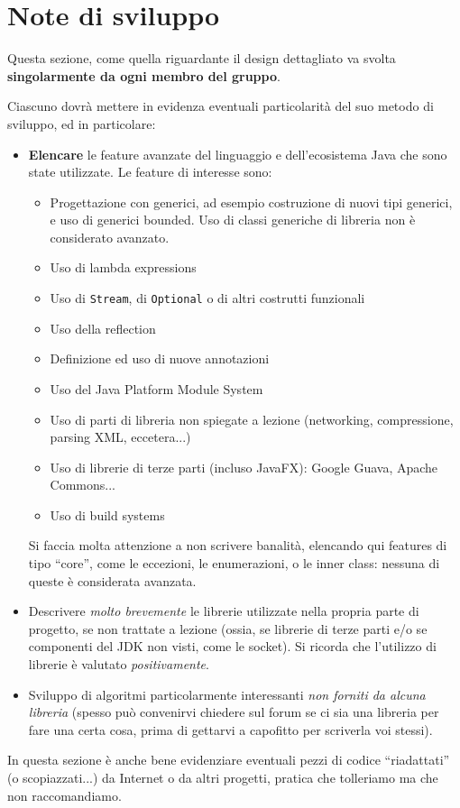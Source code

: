 \documentclass[a4paper,12pt]{report}
\begin{document}
\section{Note di sviluppo}

Questa sezione, come quella riguardante il design dettagliato va svolta \textbf{singolarmente da ogni membro del gruppo}.

Ciascuno dovrà mettere in evidenza eventuali particolarità del suo metodo di sviluppo, ed in particolare:
\begin{itemize}
	\item \textbf{Elencare} le feature avanzate del linguaggio e dell'ecosistema Java che sono state 
utilizzate. Le feature di interesse sono:
	\begin{itemize}
		\item Progettazione con generici, ad esempio costruzione di nuovi tipi generici, e uso di generici bounded. Uso di classi generiche di libreria non è considerato avanzato.
		\item Uso di lambda expressions
		\item Uso di \texttt{Stream}, di \texttt{Optional} o di altri costrutti funzionali
		\item Uso della reflection
		\item Definizione ed uso di nuove annotazioni
		\item Uso del Java Platform Module System
		\item Uso di parti di libreria non spiegate a lezione (networking, compressione, parsing XML, eccetera...)
		\item Uso di librerie di terze parti (incluso JavaFX): Google Guava, Apache Commons...
		\item Uso di build systems
	\end{itemize}
	Si faccia molta attenzione a non scrivere banalità, elencando qui features di tipo ``core'', come le eccezioni, le enumerazioni, o le inner class: nessuna di queste è considerata avanzata.
	\item Descrivere \textit{molto brevemente} le librerie utilizzate nella propria parte di progetto, se non trattate a lezione (ossia, se librerie di terze parti e/o se componenti del JDK non visti, come le socket). Si ricorda che l'utilizzo di librerie è valutato \emph{positivamente}.
	\item Sviluppo di algoritmi particolarmente interessanti \emph{non forniti da alcuna libreria} (spesso può convenirvi chiedere sul forum se ci sia una libreria per fare una certa cosa, prima di gettarvi a capofitto per scriverla voi stessi).
\end{itemize}
%
In questa sezione è anche bene evidenziare eventuali pezzi di codice ``riadattati'' (o scopiazzati...) da Internet o da altri progetti, pratica che tolleriamo ma che non raccomandiamo.
\end{document}
